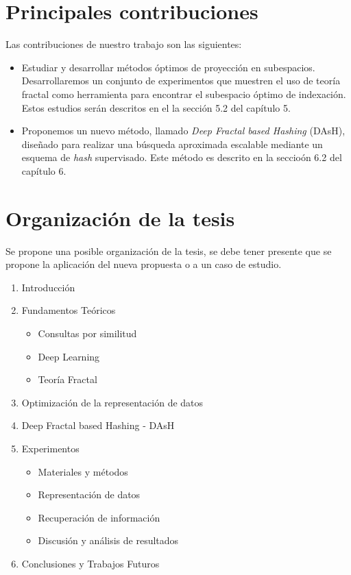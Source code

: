 \section{Principales contribuciones}

 

Las contribuciones de nuestro trabajo son las siguientes:
\begin{itemize}

    \item  Estudiar y desarrollar  m\'etodos óptimos de proyecci\'on en subespacios. Desarrollaremos un conjunto de experimentos que muestren el uso de teoría fractal como herramienta para encontrar  el subespacio óptimo  de indexaci\'on.    Estos estudios serán   descritos en el la sección 5.2 del capítulo 5.

  \item Proponemos un nuevo m\'etodo, llamado \textit{Deep Fractal based  Hashing} (DAsH), diseñado para realizar una búsqueda aproximada escalable mediante un esquema de \textit{hash} supervisado. Este m\'etodo es descrito en la seccio\'on 6.2 del cap\'itulo 6.
\end{itemize}

\section{Organización de la tesis}

Se propone  una  posible  organización de  la  tesis,  se debe  tener  presente  que  se propone  la aplicación  del nueva propuesta o a un caso de estudio.

\bigskip
\begin{enumerate}
	\item Introducción
	\item Fundamentos Teóricos
	\begin{itemize}
		\item Consultas por similitud
		\item Deep Learning
		\item Teoría Fractal
	\end{itemize}
	\item Optimizaci\'on de la representaci\'on de datos
	\item Deep Fractal based Hashing - DAsH
	\item Experimentos
	\begin{itemize}
		\item Materiales y métodos
		\item Representaci\'on de datos
		\item Recuperaci\'on de informaci\'on
		\item Discusión y análisis de resultados

	\end{itemize}
	\item Conclusiones y Trabajos Futuros
\end{enumerate}


